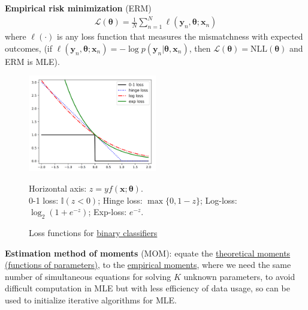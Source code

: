 \textbf{Empirical risk minimization} (ERM) 
\begin{gather}
    \mathcal{L}(\bm{\theta})=\frac{1}{N}\sum_{n=1}^N\ell(\bm{y}_n,\bm{\theta};\bm{x}_n)
\end{gather}
where $\ell(\cdot)$ is any loss function that measures the mismatchness with expected outcomes, 
(if $\ell(\bm{y}_n,\bm{\theta};\bm{x}_n)=-\log{p(\bm{y}_n|\bm{\theta},\bm{x}_n)}$,
then $\mathcal{L}(\bm{\theta})=\text{NLL}(\bm{\theta})$ and ERM is MLE).

    

\begin{figure}[hptb]
    \centering
    \includegraphics[width=0.5\textwidth]{figs/lossfunc.png}
    \caption{Loss functions for \uline{binary classifiers}}
    {\footnotesize Horizontal axis: $z=yf(\bm{x};\bm{\theta})$. \\
    0-1 loss: $\mathbb{I}(z<0)$;
    Hinge loss: $\max\{0,1-z\}$;
    Log-loss: $\log_2{(1+e^{-z})}$;
    Exp-loss: $e^{-z}$.}
    \label{fig:lossfunc}
\end{figure}

\textbf{Estimation method of moments} (MOM): 
equate the \uline{theoretical moments (functions of parameters)},
to the \uline{empirical moments},
where we need the same number of simultaneous equations for solving $K$ unknown parameters,
to avoid difficult computation in MLE 
but with less efficiency of data usage, so can be used to initialize iterative algorithms for MLE.

